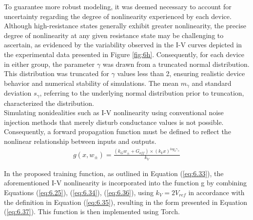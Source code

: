 
\noindent To guarantee more robust modeling, it was deemed necessary to account for uncertainty regarding the degree of nonlinearity experienced by each device. Although high-resistance states generally exhibit greater nonlinearity, the precise degree of nonlinearity at any given resistance state may be challenging to ascertain, as evidenced by the variability observed in the I-V curves depicted in the experimental data presented in Figure \ref{fig:6h}. Consequently, for each device in either group, the parameter $\gamma$ was drawn from a truncated normal distribution. This distribution was truncated for $\gamma$ values less than 2, ensuring realistic device behavior and numerical stability of simulations. The mean $m_\gamma$ and standard deviation $s_\gamma$, referring to the underlying normal distribution prior to truncation, characterized the distribution. \\

\noindent Simulating nonidealities such as I-V nonlinearity using conventional noise injection methods that merely disturb conductance values is not possible. Consequently, a forward propagation function must be defined to reflect the nonlinear relationship between inputs and outputs.
\begin{align}
g(x, w_\pm) = \frac{\left( k_Gw_\pm + G_{off}\right) \times \left( k_V x \right)^{log_2\gamma_\pm}}{k_V} \label{eq:6.37}
\end{align}

\noindent In the proposed training function, as outlined in Equation (\ref{eq:6.33}), the aforementioned I-V nonlinearity is incorporated into the function g by combining Equations (\ref{eq:6.25}), (\ref{eq:6.34}), (\ref{eq:6.36}), using $k_V = 2V_{ref}$ in accordance with the definition in Equation (\ref{eq:6.35}), resulting in the form presented in Equation (\ref{eq:6.37}). This function is then implemented using Torch.\\


